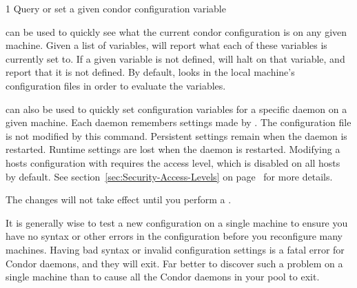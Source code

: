 \begin{ManPage}{\label{man-condor-config-val}}{1}
{Query or set a given condor configuration variable}
\Synopsis {}








\Description

 can be used to quickly see what the current
condor configuration is on any given machine.  Given a list of
variables,  will report what each of these
variables is currently set to.  If a given variable is not defined,
 will halt on that variable, and report that it is
not defined.  By default,  looks in the local
machine's configuration files in order to evaluate the variables.

 can also be used to quickly set configuration
variables for a specific daemon on a given machine.  Each daemon
remembers settings made by .  The configuration
file is not modified by this command.  Persistent settings remain when
the daemon is restarted.  Runtime settings are lost when the daemon is
restarted.  Modifying a hosts configuration with 
requires the  access level, which is disabled on all
hosts by default.  See section~\ref{sec:Security-Access-Levels} on
page~\pageref{sec:Security-Access-Levels} for more details.

\Note The changes will not take effect until you perform a
.

\Note It is generally wise to test a new configuration on a single
machine to ensure you have no syntax or other errors in the
configuration before you reconfigure many machines.  
Having bad syntax or invalid configuration settings is a fatal error
for Condor daemons, and they will exit.
Far better to discover such a problem on a single machine than to
cause all the Condor daemons in your pool to exit.


\end{ManPage}
